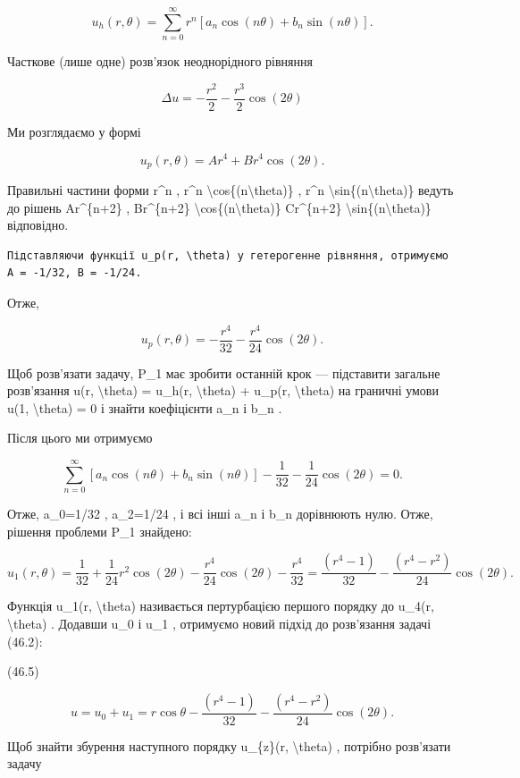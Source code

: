 \documentclass[
]{article}
\begin{document}
\[
u_h(r, \theta) = \sum_{n=0}^{\infty} r^n [a_n \cos(n\theta) + b_n \sin(n\theta)].
\]

Часткове (лише одне) розв'язок неоднорідного рівняння

\[
\Delta u = -\frac{r^2}{2} - \frac{r^3}{2} \cos{(2\theta)}
\]

Ми розглядаємо у формі

\[
u_p(r, \theta) = Ar^4 + Br^4 \cos(2\theta).
\]

Правильні частини форми r\^{}n , r\^{}n
\textbackslash cos\{(n\textbackslash theta)\} , r\^{}n
\textbackslash sin\{(n\textbackslash theta)\} ведуть до рішень
Ar\^{}\{n+2\} , Br\^{}\{n+2\}
\textbackslash cos\{(n\textbackslash theta)\} Cr\^{}\{n+2\}
\textbackslash sin\{(n\textbackslash theta)\} відповідно.

\begin{verbatim}
Підставляючи функції u_p(r, \theta) у гетерогенне рівняння, отримуємо A = -1/32, B = -1/24.
\end{verbatim}

Отже,

\[
u_p(r, \theta) = -\frac{r^4}{32} - \frac{r^4}{24} \cos(2\theta).
\]

Щоб розв'язати задачу, P\_1 має зробити останній крок --- підставити
загальне розв'язання u(r, \textbackslash theta) = u\_h(r,
\textbackslash theta) + u\_p(r, \textbackslash theta) на граничні умови
u(1, \textbackslash theta) = 0 і знайти коефіцієнти a\_n і b\_n .

Після цього ми отримуємо

\[
\sum_{n=0}^{\infty} [a_n \cos(n\theta) + b_n \sin(n\theta)] - \frac{1}{32} - \frac{1}{24} \cos(2\theta) = 0.
\]

Отже, a\_0=1/32 , a\_2=1/24 , і всі інші a\_n і b\_n дорівнюють нулю.
Отже, рішення проблеми P\_1 знайдено:

\[
u_1(r, \theta) = \frac{1}{32} + \frac{1}{24}r^2\cos(2\theta) - \frac{r^4}{24}\cos(2\theta) - \frac{r^4}{32} = \frac{(r^4 - 1)}{32} - \frac{(r^4 - r^2)}{24}\cos(2\theta).
\]

Функція u\_1(r, \textbackslash theta) називається пертурбацією першого
порядку до u\_4(r, \textbackslash theta) . Додавши u\_0 і u\_1 ,
отримуємо новий підхід до розв'язання задачі (46.2):

(46.5)

\[
u = u_0 + u_1 = r \cos \theta - \frac{(r^4 - 1)}{32} - \frac{(r^4 - r^2)}{24} \cos (2\theta).
\]

Щоб знайти збурення наступного порядку u\_\{z\}(r, \textbackslash theta)
, потрібно розв'язати задачу
\end{document}
